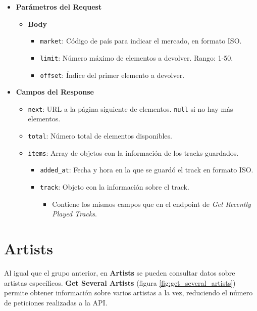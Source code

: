 \begin{itemize}
    \item \textbf{Parámetros del Request}
          \begin{itemize}
              \item \textbf{Body}
                    \begin{itemize}
                        \item \texttt{market}: Código de país para indicar el mercado, en formato ISO.
                        \item \texttt{limit}: Número máximo de elementos a devolver. Rango: 1-50.
                        \item \texttt{offset}: Índice del primer elemento a devolver.
                    \end{itemize}
          \end{itemize}
    \item \textbf{Campos del Response}
          \begin{itemize}
              \item \texttt{next}: URL a la página siguiente de elementos. \texttt{null} si no hay más elementos.
              \item \texttt{total}: Número total de elementos disponibles.
              \item \texttt{items}: Array de objetos con la información de los tracks guardados.
                    \begin{itemize}
                        \item \texttt{added\_at}: Fecha y hora en la que se guardó el track en formato ISO.
                        \item \texttt{track}: Objeto con la información sobre el track.
                              \begin{itemize}
                                  \item Contiene los mismos campos que en el endpoint de \textit{Get Recently Played Tracks}.
                              \end{itemize}
                    \end{itemize}
          \end{itemize}
\end{itemize}

\section*{Artists}

Al igual que el grupo anterior, en \textbf{Artists} se pueden consultar datos sobre artistas específicos. \textbf{Get Several Artists} (figura \ref{fig:get_several_artists}) permite obtener información sobre varios artistas a la vez, reduciendo el número de peticiones realizadas a la API.

